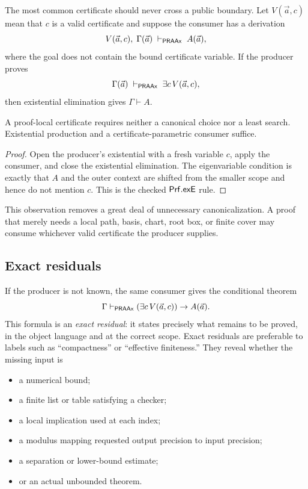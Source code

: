 The most common certificate should never cross a public boundary.  Let
\(V(\vec a,c)\) mean that \(c\) is a valid certificate and suppose the consumer
has a derivation
\[
 V(\vec a,c),\;\Gamma(\vec a)
 \;\vdash_{\mathsf{PRAAx}}\; A(\vec a),
\]
where the goal does not contain the bound certificate variable.  If the
producer proves
\[
 \Gamma(\vec a)\;\vdash_{\mathsf{PRAAx}}\;\exists c\,V(\vec a,c),
\]
then existential elimination gives \(\Gamma\vdash A\).

\begin{theorem}
A proof-local certificate requires neither a canonical choice nor a least
search.  Existential production and a certificate-parametric consumer suffice.
\end{theorem}

\begin{proof}
Open the producer's existential with a fresh variable \(c\), apply the consumer,
and close the existential elimination.  The eigenvariable condition is exactly
that \(A\) and the outer context are shifted from the smaller scope and hence do
not mention \(c\).  This is the checked \(\mathsf{Prf}.\mathsf{exE}\) rule.
\end{proof}

This observation removes a great deal of unnecessary canonicalization.  A
proof that merely needs a local path, basis, chart, root box, or finite cover
may consume whichever valid certificate the producer supplies.

\subsection{Exact residuals}

If the producer is not known, the same consumer gives the conditional theorem
\[
 \Gamma\vdash_{\mathsf{PRAAx}}
   (\exists c\,V(\vec a,c))\to A(\vec a).
\]
This formula is an \emph{exact residual}: it states precisely what remains to
be proved, in the object language and at the correct scope.  Exact residuals
are preferable to labels such as ``compactness'' or ``effective finiteness.''
They reveal whether the missing input is

\begin{itemize}
\item a numerical bound;
\item a finite list or table satisfying a checker;
\item a local implication used at each index;
\item a modulus mapping requested output precision to input precision;
\item a separation or lower-bound estimate;
\item or an actual unbounded theorem.
\end{itemize}

